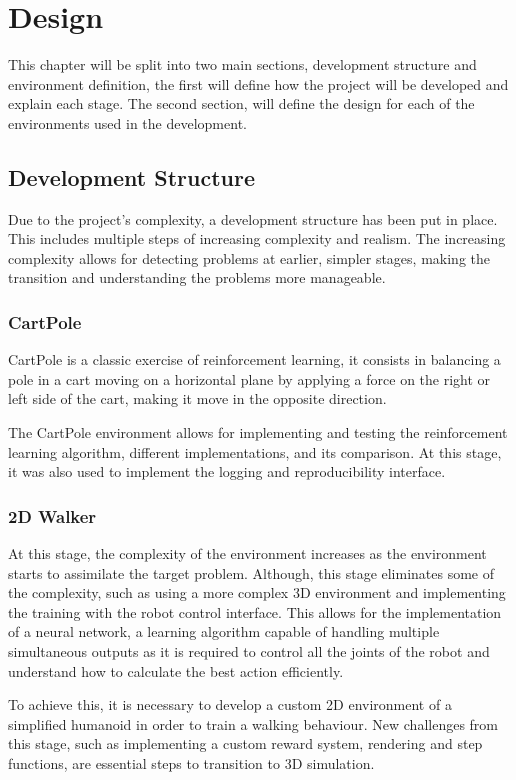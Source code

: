 \chapter{Design}
This chapter will be split into two main sections, development structure and environment definition, the first will define how the project will be developed and explain each stage. 
The second section, will define the design for each of the environments used in the development.
\section{Development Structure}
Due to the project's complexity, a development structure has been put in place. This includes multiple steps of increasing complexity and realism. The increasing complexity allows for detecting problems at earlier, simpler stages, making the transition and understanding the problems more manageable.
\subsection{CartPole}
CartPole is a classic exercise of reinforcement learning, it consists in balancing a pole in a cart moving on a horizontal plane by applying a force on the right or left side of the cart, making it move in the opposite direction. 

The CartPole environment allows for implementing and testing the reinforcement learning algorithm, different implementations, and its comparison. At this stage, it was also used to implement the logging and reproducibility interface.

\subsection{2D Walker}
At this stage, the complexity of the environment increases as the environment starts to assimilate the target problem. Although, this stage eliminates some of the complexity, such as using a more complex 3D environment and implementing the training with the robot control interface.
This allows for the implementation of a neural network, a learning algorithm capable of handling multiple simultaneous outputs as it is required to control all the joints of the robot and understand how to calculate the best action efficiently.

To achieve this, it is necessary to develop a custom 2D environment of a simplified humanoid in order to train a walking behaviour.
New challenges from this stage, such as implementing a custom reward system, rendering and step functions, are essential steps to transition to 3D simulation.

